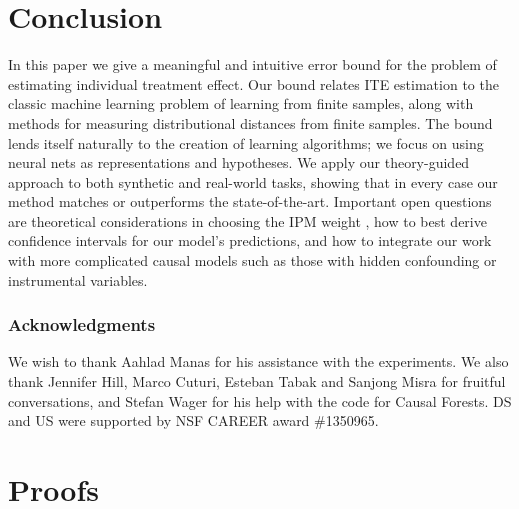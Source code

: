 \documentclass{article}
\begin{document}
 
\vskip -10pt
\section{Conclusion}
In this paper we give a meaningful and intuitive error bound for the problem of estimating individual treatment effect. Our bound relates ITE estimation to the classic machine learning problem of learning from finite samples, along with methods for measuring distributional distances from finite samples. The bound lends itself naturally to the creation of learning algorithms; we focus on using neural nets as representations and hypotheses. We apply our theory-guided approach to both synthetic and real-world tasks, showing that in every case our method matches or outperforms the state-of-the-art. Important open questions are theoretical considerations in choosing the IPM weight , how to best derive confidence intervals for our model's predictions, and how to integrate our work with more complicated causal models such as those with hidden confounding or instrumental variables. 
\subsubsection*{Acknowledgments}
We wish to thank Aahlad Manas for his assistance with the experiments. We also thank Jennifer Hill, Marco Cuturi, Esteban Tabak and Sanjong Misra for fruitful conversations, and Stefan Wager for his help with the code for Causal Forests. DS and US were supported by NSF CAREER award \#1350965.

{\small


}
\newpage

\appendix

\section{Proofs}\label{sec:proof}
\end{document}
